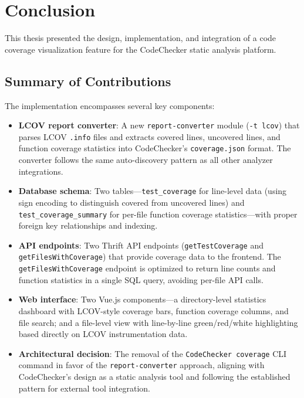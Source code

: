 \chapter{Conclusion}
\label{ch:sum}

This thesis presented the design, implementation, and integration of a code coverage visualization feature for the CodeChecker static analysis platform.

\section{Summary of Contributions}

The implementation encompasses several key components:

\begin{itemize}
    \item \textbf{LCOV report converter}: A new \texttt{report-converter} module (\texttt{-t lcov}) that parses LCOV \texttt{.info} files and extracts covered lines, uncovered lines, and function coverage statistics into CodeChecker's \texttt{coverage.json} format. The converter follows the same auto-discovery pattern as all other analyzer integrations.

    \item \textbf{Database schema}: Two tables---\texttt{test\_coverage} for line-level data (using sign encoding to distinguish covered from uncovered lines) and \texttt{test\_coverage\_summary} for per-file function coverage statistics---with proper foreign key relationships and indexing.

    \item \textbf{API endpoints}: Two Thrift API endpoints (\texttt{getTestCoverage} and \texttt{getFilesWithCoverage}) that provide coverage data to the frontend. The \texttt{getFilesWithCoverage} endpoint is optimized to return line counts and function statistics in a single SQL query, avoiding per-file API calls.

    \item \textbf{Web interface}: Two Vue.js components---a directory-level statistics dashboard with LCOV-style coverage bars, function coverage columns, and file search; and a file-level view with line-by-line green/red/white highlighting based directly on LCOV instrumentation data.

    \item \textbf{Architectural decision}: The removal of the \texttt{CodeChecker coverage} CLI command in favor of the \texttt{report-converter} approach, aligning with CodeChecker's design as a static analysis tool and following the established pattern for external tool integration.
\end{itemize}

